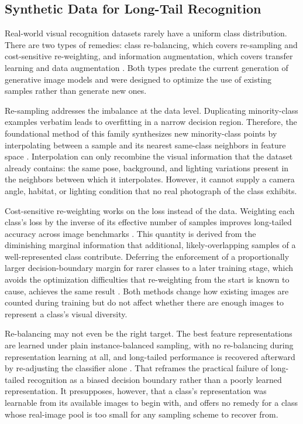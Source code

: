 \subsection{Synthetic Data for Long-Tail Recognition}\label{sec:lit_synthetic_long_tail}

Real-world visual recognition datasets rarely have a uniform class distribution. There are two types of remedies: class re-balancing, which covers re-sampling and cost-sensitive re-weighting, and information augmentation, which covers transfer learning and data augmentation \cite{zhangDeepLongTailedLearning2023}. Both types predate the current generation of generative image models and were designed to optimize the use of existing samples rather than generate new ones.

Re-sampling addresses the imbalance at the data level. Duplicating minority-class examples verbatim leads to overfitting in a narrow decision region. Therefore, the foundational method of this family synthesizes new minority-class points by interpolating between a sample and its nearest same-class neighbors in feature space \cite{chawlaSMOTESyntheticMinority2002}. Interpolation can only recombine the visual information that the dataset already contains: the same pose, background, and lighting variations present in the neighbors between which it interpolates. However, it cannot supply a camera angle, habitat, or lighting condition that no real photograph of the class exhibits.

Cost-sensitive re-weighting works on the loss instead of the data. Weighting each class's loss by the inverse of its effective number of samples improves long-tailed accuracy across image benchmarks \cite{cuiClassBalancedLossBased2019}. This quantity is derived from the diminishing marginal information that additional, likely-overlapping samples of a well-represented class contribute. Deferring the enforcement of a proportionally larger decision-boundary margin for rarer classes to a later training stage, which avoids the optimization difficulties that re-weighting from the start is known to cause, achieves the same result \cite{caoLearningImbalancedDatasets2019}. Both methods change how existing images are counted during training but do not affect whether there are enough images to represent a class's visual diversity.

Re-balancing may not even be the right target. The best feature representations are learned under plain instance-balanced sampling, with no re-balancing during representation learning at all, and long-tailed performance is recovered afterward by re-adjusting the classifier alone \cite{kangDecouplingRepresentationClassifier2020}. That reframes the practical failure of long-tailed recognition as a biased decision boundary rather than a poorly learned representation. It presupposes, however, that a class's representation was learnable from its available images to begin with, and offers no remedy for a class whose real-image pool is too small for any sampling scheme to recover from.

